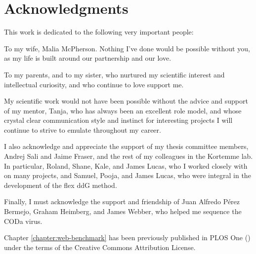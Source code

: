 \chapter*{Acknowledgments}

This work is dedicated to the following very important people:

To my wife, Malia McPherson. Nothing I've done would be possible without you, as my life is built around our partnership and our love.

To my parents, and to my sister, who nurtured my scientific interest and intellectual curiosity, and who continue to love support me.

My scientific work would not have been possible without the advice and support of my mentor, Tanja, who has always been an excellent role model, and whose crystal clear communication style and instinct for interesting projects I will continue to strive to emulate throughout my career.

I also acknowledge and appreciate the support of my thesis committee members, Andrej Sali and Jaime Fraser, and the rest of my colleagues in the Kortemme lab.
In particular, Roland, Shane, Kale, and James Lucas, who I worked closely with on many projects, and Samuel, Pooja, and James Lucas, who were integral in the development of the flex ddG method.

Finally, I must acknowledge the support and friendship of Juan Alfredo Pérez Bermejo, Graham Heimberg, and James Webber, who helped me sequence the CODa virus.

Chapter \ref{chapter:web-benchmark} has been previously published in PLOS One (\citet{conchuir_web_2015}) under the terms of the Creative Commons Attribution License.

